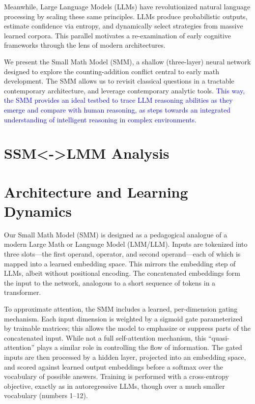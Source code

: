 \documentclass{article}
\newcommand{\rrsuggestion}[1]{\textcolor{blue}{#1}}
\begin{document}
Meanwhile, Large Language Models (LLMs) have revolutionized natural language processing by scaling these same principles. LLMs produce probabilistic outputs, estimate confidence via entropy, and dynamically select strategies from massive learned corpora. This parallel motivates a re-examination of early cognitive frameworks through the lens of modern architectures.

We present the Small Math Model (SMM), a shallow (three-layer) neural network designed to explore the counting-addition conflict central to early math development. The SMM allows us to revisit classical questions in a tractable contemporary architecture, and leverage contemporary analytic tools. \rrsuggestion{This way, the SMM provides an ideal testbed to trace LLM reasoning abilities as they emerge and compare with human reasoning, as steps towards an integrated understanding of intelligent reasoning in complex environments.}

\section{SSM<->LMM Analysis}

\section{Architecture and Learning Dynamics}

Our Small Math Model (SMM) is designed as a pedagogical analogue of a modern Large Math or Language Model (LMM/LLM). Inputs are tokenized into three slots---the first operand, operator, and second operand---each of which is mapped into a learned embedding space. This mirrors the embedding step of LLMs, albeit without positional encoding. The concatenated embeddings form the input to the network, analogous to a short sequence of tokens in a transformer.

To approximate attention, the SMM includes a learned, per-dimension gating mechanism. Each input dimension is weighted by a sigmoid gate parameterized by trainable matrices; this allows the model to emphasize or suppress parts of the concatenated input. While not a full self-attention mechanism, this ``quasi-attention'' plays a similar role in controlling the flow of information. The gated inputs are then processed by a hidden layer, projected into an embedding space, and scored against learned output embeddings before a softmax over the vocabulary of possible answers. Training is performed with a cross-entropy objective, exactly as in autoregressive LLMs, though over a much smaller vocabulary (numbers 1--12).
\end{document}
